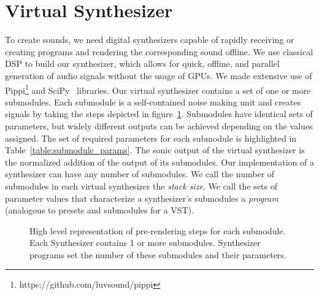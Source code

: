 \documentclass[\main/thesis.tex]{subfiles}
\begin{document}
\section{Virtual Synthesizer}
\label{vs}
 To create sounds, we need digital synthesizers capable of rapidly receiving or creating programs and rendering the corresponding sound offline. We use classical DSP to build our synthesizer, which allows for quick, offline, and parallel generation of audio signals without the usage of GPUs. We made extensive use of Pippi\footnote{https://github.com/luvsound/pippi} and SciPy~\cite{jones2001scipy} libraries. Our virtual synthesizer contains a set of one or more submodules. Each submodule is a self-contained noise making unit and creates signals by taking the steps depicted in figure~\ref{fig:submodule}. Submodules have identical sets of parameters, but widely different outputs can be achieved depending on the values assigned. The set of required parameters for each submodule is highlighted in Table~\ref{table:submodule_params}. The sonic output of the virtual synthesizer is the normalized addition of the output of its submodules. Our implementation of a synthesizer can have any number of submodules. We call the number of submodules in each virtual synthesizer the \textit{stack size}. We call the sets of parameter values that characterize a synthesizer's submodules a \textit{program} (analogous to presets and submodules for a VST).  

 \begin{figure}[htbp]
    \begin{center}
    \end{center}
    \caption{High level representation of pre-rendering steps for each submodule. Each Synthesizer contains 1 or more submodules. Synthesizer programs set the number of these submodules and their parameters.
    }
\label{fig:submodule}
\end{figure}
\end{document}
